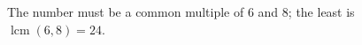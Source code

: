 The number must be a common multiple of $6$ and $8$; the least is $\operatorname{lcm}(6,8)=\boxed{24}$.
